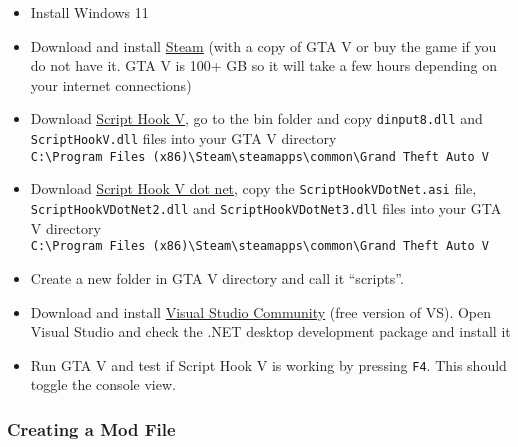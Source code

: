 \documentclass[
  openany]{book}
\begin{document}
\begin{itemize}
\item
  Install Windows 11
\item
  Download and install \href{https://store.steampowered.com/about/}{Steam} (with a copy of GTA V or buy the game if you do not have it. GTA V is 100+ GB so it will take a few hours depending on your internet connections)
\item
  Download \href{https://store.steampowered.com/about/}{Script Hook V}, go to the bin folder and copy \texttt{dinput8.dll} and \texttt{ScriptHookV.dll} files into your GTA V directory \texttt{C:\textbackslash{}Program\ Files\ (x86)\textbackslash{}Steam\textbackslash{}steamapps\textbackslash{}common\textbackslash{}Grand\ Theft\ Auto\ V}
\item
  Download \href{https://store.steampowered.com/about/}{Script Hook V dot net}, copy the \texttt{ScriptHookVDotNet.asi} file, \texttt{ScriptHookVDotNet2.dll} and \texttt{ScriptHookVDotNet3.dll} files into your GTA V directory \texttt{C:\textbackslash{}Program\ Files\ (x86)\textbackslash{}Steam\textbackslash{}steamapps\textbackslash{}common\textbackslash{}Grand\ Theft\ Auto\ V}
\item
  Create a new folder in GTA V directory and call it ``scripts''.
\item
  Download and install \href{https://store.steampowered.com/about/}{Visual Studio Community} (free version of VS). Open Visual Studio and check the .NET desktop development package and install it
\item
  Run GTA V and test if Script Hook V is working by pressing \texttt{F4}. This should toggle the console view.
\end{itemize}

\hypertarget{creating-a-mod-file}{%
\subsubsection*{Creating a Mod File}\label{creating-a-mod-file}}
\end{document}
